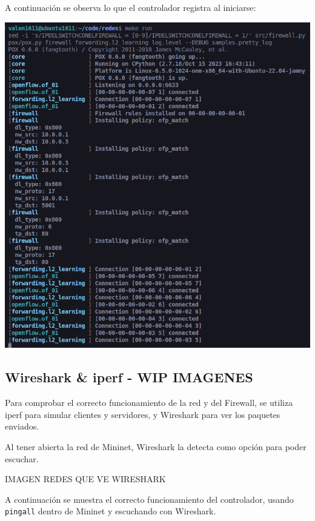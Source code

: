 \documentclass{article}
\begin{document}
A continuación se observa lo que el controlador registra al iniciarse:
\begin{center}
 \includegraphics[scale=0.45]{images/pox_init.png}
\end{center}

\subsection{Wireshark \& iperf - WIP IMAGENES}\label{wireshark-iperf}

Para comprobar el correcto funcionamiento de la red y del Firewall, se utiliza iperf para simular clientes y servidores, y Wireshark para ver los paquetes enviados.

Al tener abierta la red de Mininet, Wireshark la detecta como opción para poder escuchar.

IMAGEN REDES QUE VE WIRESHARK
\begin{center}
\end{center}

A continuación se muestra el correcto funcionamiento del controlador, usando \texttt{pingall} dentro de Mininet y escuchando con Wireshark.
\end{document}
